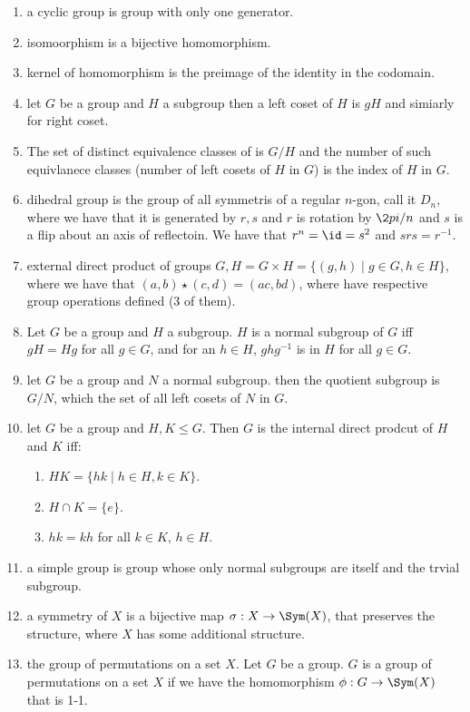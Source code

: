 \begin{enumerate}
	\item a cyclic group is  group with only one generator. 
	\item isomoorphism is a bijective homomorphism. 
	\item kernel of homomorphism is the preimage of the identity in the codomain. 
	\item let $G$ be a group and $H$ a subgroup then a left coset of $H$ is $gH$ and simiarly for right coset. 
	\item The set of distinct equivalence classes of is $G/H$ and the number of such equivlanece classes (number of left cosets of $H$ in $G$) is the index of $H$ in $G$. 
	\item dihedral group is the group of all symmetris of a regular $n$-gon, call it $D_n$, where we have that it is generated by $r,s$ and $r$ is rotation by $\2pi / n$ and $s$ is a flip about an axis of reflectoin. We have that $r^n = \id = s^2$ and $srs = r^{-1}$. 
	\item external direct product of groups $G,H = G \times H = \{(g,h) \mid g \in G, h \in H\}$, where we have that $(a,b) \star (c,d) = (ac,bd)$, where have respective group operations defined (3 of them). 
	\item Let $G$ be a group and $H$ a subgroup. $H$ is a normal subgroup of $G$ iff $gH = Hg$ for all $g \in G$, and for an $h \in H$, $ghg^{-1}$ is in $H$ for all $g \in G$. 
	\item let $G$ be a group and $N$ a normal subgroup. then the quotient subgroup is $G/N$, which the set of all left cosets of $N$ in $G$. 
	\item let $G$ be a group and $H,K \leq G$. Then $G$ is the internal direct prodcut of $H$ and $K$ iff: 
	\begin{enumerate}
		\item $HK = \{hk \mid h \in H, k \in K\}$. 
		\item $H \cap K = \{e\}$. 
		\item $hk = kh$ for all $k \in K$, $h \in H$. 
	\end{enumerate}
	\item a simple group is group whose only normal subgroups are itself and the trvial subgroup. 	
	\item a symmetry of $X$ is a bijective map $\sigma: X \to \Sym(X)$, that preserves the structure, where $X$ has some additional structure. 
	\item the group of permutations on a set $X$. Let $G$ be a group. $G$ is a group of permutations on a set $X$ if we have the homomorphism $\phi: G \to \Sym(X)$ that is 1-1. 

\end{enumerate}
